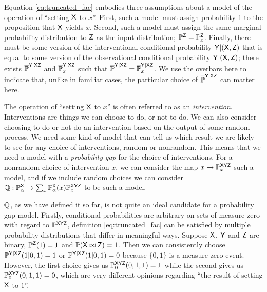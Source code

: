 Equation \ref{eq:truncated_fac} embodies three assumptions about a model of the operation of ``setting $\mathsf{X}$ to $x$''. First, such a model must assign probability 1 to the proposition that $\mathsf{X}$ yields $x$. Second, such a model must assign the same marginal probability distribution to $\mathsf{Z}$ as the input distribution; $\mathbb{P}^{\mathsf{Z}}=\mathbb{P}_{x}^{\mathsf{Z}}$. Finally, there must be some version of the interventional conditional probability $\mathsf{Y}|(\mathsf{X},\mathsf{Z})$ that is equal to some version of the observational conditional probability $\mathsf{Y}|(\mathsf{X},\mathsf{Z})$; there exists $\overline{\mathbb{P}}^{\mathsf{Y}|\mathsf{XZ}}$ and $\overline{\mathbb{P}}_x^{\mathsf{Y}|\mathsf{XZ}}$ such that $\overline{\mathbb{P}}^{\mathsf{Y}|\mathsf{XZ}}=\overline{\mathbb{P}}_x^{\mathsf{Y}|\mathsf{XZ}}$. We use the overbars here to indicate that, unlike in familiar cases, the particular choice of $\overline{\mathbb{P}}^{\mathsf{Y}|\mathsf{XZ}}$ can matter here.


The operation of ``setting $\mathsf{X}$ to $x$'' is often referred to as an \emph{intervention}. Interventions are things we can choose to do, or not to do. We can also consider choosing to do or not do an intervention based on the output of some random process. We need some kind of model that can tell us which result we are likely to see for any choice of interventions, random or nonrandom. This means that we need a model with a \emph{probability gap} for the choice of interventions. For a nonrandom choice of intervention $x$, we can consider the map $x\mapsto \mathbb{P}^{\mathsf{XYZ}}_{x}$ such a model, and if we include random choices we can consider $\mathbb{Q}:\mathbb{P}_\alpha^{\mathsf{X}}\mapsto \sum_{x} \mathbb{P}_\alpha^{\mathsf{X}}(x) \mathbb{P}^{\mathsf{XYZ}}_{x}$ to be such a model.

$\mathbb{Q}$, as we have defined it so far, is not quite an ideal candidate for a probability gap model. Firstly, conditional probabilities are arbitrary on sets of measure zero with regard to $\mathbb{P}^{\mathsf{XYZ}}$, definition \ref{eq:truncated_fac} can be satisfied by multiple probability distributions that differ in meaningful ways. Suppose $\mathsf{X}$, $\mathsf{Y}$ and $\mathsf{Z}$ are binary, $\mathbb{P}^{\mathsf{Z}}(1)=1$ and $\mathbb{P}(\mathsf{X}\bowtie \mathsf{Z})=1$. Then we can consistently choose $\mathbb{P}^{\mathsf{Y|XZ}}(1|0,1)=1$ or $\mathbb{P}^{\mathsf{Y|XZ}}(1|0,1)=0$ because $\{0,1\}$ is a measure zero event. However, the first choice gives us  $\mathbb{P}^{\mathsf{XYZ}}_{0}(0,1,1)=1$ while the second gives us $\mathbb{P}^{\mathsf{XYZ}}_{0}(0,1,1)=0$, which are very different opinions regarding ``the result of setting $\mathsf{X}$ to $1$''.

